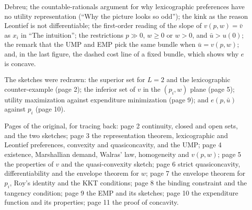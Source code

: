 \documentclass[11pt]{article}
\begin{document}
\begin{transcriptnotes}
        Debreu; the countable-rationals argument for why lexicographic preferences
        have no utility representation (``Why the picture looks so odd''); the
        kink as the reason Leontief is not differentiable; the first-order reading
        of the slope of $v(p,w)=\bar v$ as $x_i$ in ``The intuition''; the
        restrictions $p\gg0$, $w\ge0$ or $w>0$, and $\bar u>u(0)$; the remark that the UMP and EMP pick the same bundle when
        $\bar u=v(p,w)$; and, in the last figure, the dashed cost line of a fixed
        bundle, which shows why $e$ is concave.
  \item The sketches were redrawn: the superior set for $L=2$ and the lexicographic
        counter-example (page 2); the inferior set of $v$ in the $(p_i,w)$ plane
        (page 5); utility maximization against expenditure minimization (page 9);
        and $e(p,\bar u)$ against $p_i$ (page 10).
  \item Pages of the original, for tracing back: page 2 continuity, closed and
        open sets, and the two sketches; page 3 the representation theorem,
        lexicographic and Leontief preferences, convexity and quasiconcavity, and
        the UMP; page 4 existence, Marshallian demand, Walras' law, homogeneity and
        $v(p,w)$; page 5 the properties of $v$ and the quasi-convexity sketch;
        page 6 strict quasiconcavity, differentiability and the envelope theorem
        for $w$; page 7 the envelope theorem for $p_i$, Roy's identity and the KKT
        conditions; page 8 the binding constraint and the tangency condition;
        page 9 the EMP and its sketches; page 10 the expenditure function and its
        properties; page 11 the proof of concavity.
\end{transcriptnotes}
\end{document}
